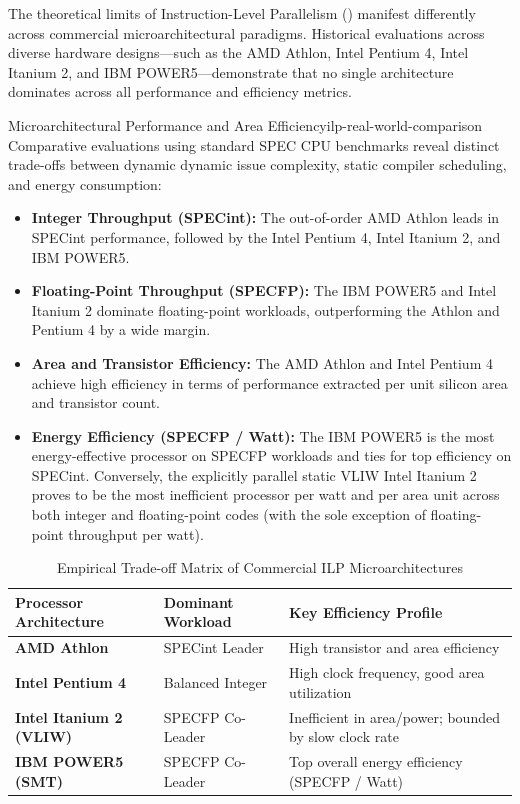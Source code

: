 The theoretical limits of Instruction-Level Parallelism () manifest differently across commercial microarchitectural paradigms. Historical evaluations across diverse hardware designs—such as the AMD Athlon, Intel Pentium 4, Intel Itanium 2, and IBM POWER5—demonstrate that no single architecture dominates across all performance and efficiency metrics.

\begin{observation}{Microarchitectural Performance and Area Efficiency}{ilp-real-world-comparison}
Comparative evaluations using standard SPEC CPU benchmarks reveal distinct trade-offs between dynamic dynamic issue complexity, static compiler scheduling, and energy consumption:
\begin{itemize}
    \item \textbf{Integer Throughput (SPECint):} The out-of-order AMD Athlon leads in SPECint performance, followed by the Intel Pentium 4, Intel Itanium 2, and IBM POWER5.
    \item \textbf{Floating-Point Throughput (SPECFP):} The IBM POWER5 and Intel Itanium 2 dominate floating-point workloads, outperforming the Athlon and Pentium 4 by a wide margin.
    \item \textbf{Area and Transistor Efficiency:} The AMD Athlon and Intel Pentium 4 achieve high efficiency in terms of performance extracted per unit silicon area and transistor count.
    \item \textbf{Energy Efficiency (SPECFP / Watt):} The IBM POWER5 is the most energy-effective processor on SPECFP workloads and ties for top efficiency on SPECint. Conversely, the explicitly parallel static VLIW Intel Itanium 2 proves to be the most inefficient processor per watt and per area unit across both integer and floating-point codes (with the sole exception of floating-point throughput per watt).
\end{itemize}
\end{observation}

\begin{table}[htbp]
\centering
\caption{Empirical Trade-off Matrix of Commercial ILP Microarchitectures}
\label{tab:real_world_ilp_processors}
\small
\setlength{\tabcolsep}{5pt}
\begin{tabularx}{\textwidth}{|>{\hsize=0.8\hsize\raggedright\arraybackslash}X|>{\hsize=1.0\hsize\raggedright\arraybackslash}X|>{\hsize=1.2\hsize\raggedright\arraybackslash}X|}
\hline
\textbf{Processor Architecture} & \textbf{Dominant Workload} & \textbf{Key Efficiency Profile} \\ \hline
\textbf{AMD Athlon} & SPECint Leader & High transistor and area efficiency \\ \hline
\textbf{Intel Pentium 4} & Balanced Integer & High clock frequency, good area utilization \\ \hline
\textbf{Intel Itanium 2 (VLIW)} & SPECFP Co-Leader & Inefficient in area/power; bounded by slow clock rate \\ \hline
\textbf{IBM POWER5 (SMT)} & SPECFP Co-Leader & Top overall energy efficiency (SPECFP / Watt) \\ \hline
\end{tabularx}
\end{table}

